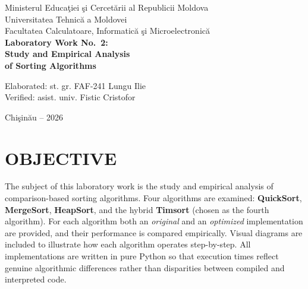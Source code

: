 \documentclass[12pt,a4paper]{article}
\begin{document}
	
	\begin{titlepage}
		\centering
		\vspace*{1cm}
		{\Large Ministerul Educa\c{t}iei \c{s}i Cercet\u{a}rii al Republicii Moldova\\}
		\vspace{0.5cm}
		{\Large Universitatea Tehnic\u{a} a Moldovei\\}
		\vspace{0.3cm}
		{\Large Facultatea Calculatoare, Informatic\u{a} \c{s}i Microelectronic\u{a}\\}
		\vspace{3cm}
		{\LARGE\bfseries Laboratory Work No.~2:\\}
		\vspace{0.5cm}
		{\LARGE\bfseries Study and Empirical Analysis\\}
		\vspace{0.3cm}
		{\LARGE\bfseries of Sorting Algorithms\\}
		\vspace{4cm}
		\begin{flushleft}
			\hspace{6cm}Elaborated: st. gr. FAF-241 Lungu Ilie\\
			\vspace{1cm}
			\hspace{6cm}Verified: asist. univ. Fistic Cristofor\\
		\end{flushleft}
		\vfill
		{\large Chi\c{s}in\u{a}u -- 2026}
	\end{titlepage}
	
	\newpage
	\tableofcontents
	\newpage
	
	\section{OBJECTIVE}
	
	The subject of this laboratory work is the study and empirical analysis of
	comparison-based sorting algorithms. Four algorithms are examined:
	\textbf{QuickSort}, \textbf{MergeSort}, \textbf{HeapSort}, and the hybrid
	\textbf{Timsort} (chosen as the fourth algorithm). For each algorithm both an
	\emph{original} and an \emph{optimized} implementation are provided, and their
	performance is compared empirically. Visual diagrams are included to illustrate
	how each algorithm operates step-by-step. All implementations are written in
	pure Python so that execution times reflect genuine algorithmic differences
	rather than disparities between compiled and interpreted code.
	
\end{document}
